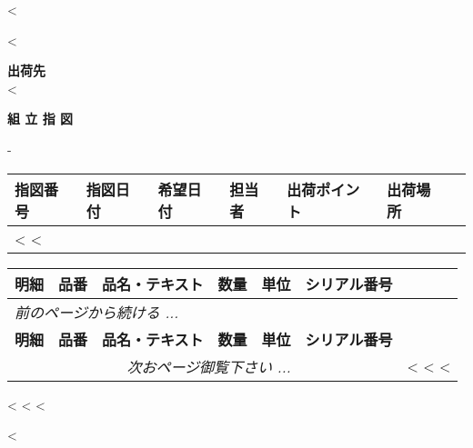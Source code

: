 <%

\begin{CJK}{UTF8}{arialuni}

\vspace*{-3.3cm}
<%
\vspace*{0.5cm}

\parbox[t]{.80\textwidth}{
\textbf{出荷先} \\
<%
}

\vspace{1.2cm}

\centerline{\large\bf{組 立 指 図}}
\normalsize

\vspace{0.5cm}
-
\vspace{0.2cm}

\begin{tabularx}{\textwidth}{*{7}{|X}|} \hline
  \textbf{指図番号} & \textbf{指図日付} & \textbf{希望日付} & \textbf{担当者}
  & \textbf{出荷ポイント} & \textbf{出荷場所} \\ [0.5em]
  \hline
  <%
  <%
  \hline
\end{tabularx}

\vspace{0.5cm}

\begin{longtable}{|ll p{5.5cm} @{\extracolsep\fill} rcl|} \hline
  \textbf{明細} & \textbf{品番} & \textbf{品名・テキスト} & \textbf{数量} & \textbf{単位}  & \textbf{シリアル番号} \\     
  \hline
\endfirsthead
  \multicolumn{5}{l}{\emph{前のページから続ける ...}} \\
  \hline
  \textbf{明細} & \textbf{品番} & \textbf{品名・テキスト} & \textbf{数量} & \textbf{単位}  & \textbf{シリアル番号} \\     
  \hline
\endhead
   \hline \multicolumn{5}{r}{\emph{次おページ御覧下さい ...}}
\endfoot
   \hline
\endlastfoot
<%
  <%
  <%
		& & <%
	<%
<%
\end{longtable}

\parbox{\textwidth}{
\vspace{0.5cm}
<%
  <%
<%
}

\vfill
<%
\end{CJK}

